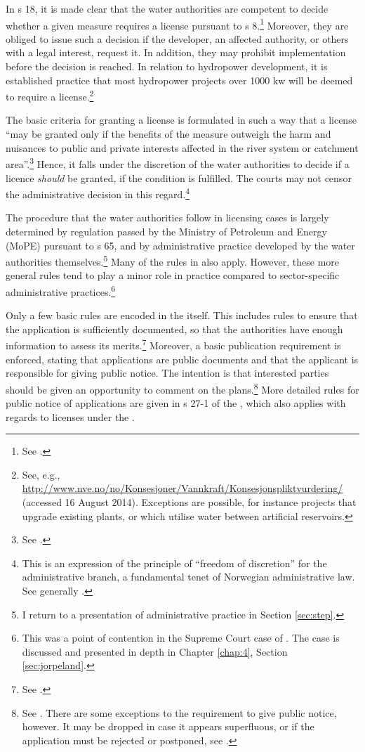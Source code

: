 In s 18, it is made clear that the water authorities are competent to decide whether a given measure requires a license pursuant to s 8.\footnote{See \cite[18]{wra00}.}  Moreover, they are obliged to issue such a decision if the developer, an affected authority, or others with a legal interest, request it. In addition, they may prohibit implementation before the decision is reached. In relation to hydropower development, it is established practice that most hydropower projects over 1000 kw will be deemed to require a license.\footnote{See, e.g., \url{http://www.nve.no/no/Konsesjoner/Vannkraft/Konsesjonspliktvurdering/} (accessed 16 August 2014). Exceptions are possible, for instance projects that upgrade existing plants, or which utilise water between artificial reservoirs.}

The basic criteria for granting a license is formulated in such a way that a license ``may be granted only if the benefits of the measure outweigh the harm and nuisances to public and private interests affected in the river system or catchment area''.\footnote{See \cite[25]{wra00}.} Hence, it falls under the discretion of the water authorities to decide if a licence {\it should} be granted, if the condition is fulfilled. The courts may not censor the administrative decision in this regard.\footnote{This is an expression of the principle of ``freedom of discretion'' for the administrative branch, a fundamental tenet of Norwegian administrative law. See generally \cite[71-74]{eckhoff14}.}

The procedure that the water authorities follow in licensing cases is largely determined by regulation passed by the Ministry of Petroleum and Energy (MoPE) pursuant to s 65, and by administrative practice developed by the water authorities themselves.\footnote{I return to a presentation of administrative practice in Section \ref{sec:step}.} Many of the rules in \cite{paa67} also apply. However, these more general rules tend to play a minor role in practice compared to sector-specific administrative practices.\footnote{This was a point of contention in the Supreme Court case of \cite{jorpeland11}. The case is discussed and presented in depth in Chapter \ref{chap:4}, Section \ref{sec:jorpeland}.}

Only a few basic rules are encoded in the \cite{wra00} itself. This includes rules to ensure that the application is sufficiently documented, so that the authorities have enough information to assess its merits.\footnote{See \cite[23]{wra00}.} Moreover, a basic publication requirement is enforced, stating that applications are public documents and that the applicant is responsible for giving public notice. The intention is that interested parties should be given an opportunity to comment on the plans.\footnote{See \cite[24]{wra00}. There are some exceptions to the requirement to give public notice, however. It may be dropped in case it appears superfluous, or if the application must be rejected or postponed, see \cite[24a-24c]{wra00}.} More detailed rules for public notice of applications are given in s 27-1 of the \cite{pb08}, which also applies with regards to licenses under the \cite[8]{wra00}.

